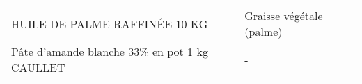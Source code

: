 \begin{longtable}{p{5cm}p{10cm}}
                                                                            HUILE DE PALME RAFFINÉE 10 KG &                                                                                                                                                                                                                                                                                                                                                                                                                                                                                                                                                                                                                                                                                                                                                                                                                                                                                                                                                                                                                 Graisse végétale (palme) \\
                                                            Pâte d'amande blanche 33\% en pot 1 kg CAULLET &                                                                                                                                                                                                                                                                                                                                                                                                                                                                                                                                                                                                                                                                                                                                                                                                                                                                                                                                                                                                                                        - \\

\end{longtable}
